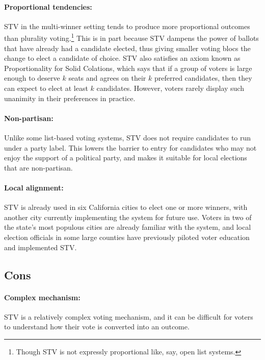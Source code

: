 \documentclass{amsart}
\theoremstyle{definition}
\begin{document}
\paragraph{\bf{Proportional tendencies:}} 
STV in the multi-winner setting tends to produce more
proportional outcomes than plurality voting.\footnote{Though STV is not expressly proportional like, say, open list systems.} 
This is in part because STV dampens the 
power of ballots that have already had a candidate elected, thus giving smaller
voting blocs the change to elect a candidate of choice.  
STV also satisfies an axiom known as Proportionality for Solid Colations,
which says that if a group of voters is large enough to deserve $k$ seats and agrees on 
their $k$ preferred candidates, then they can expect to elect at least $k$ candidates.
However, voters rarely display such unanimity in their preferences in practice.\\

\paragraph{\bf{Non-partisan:}} 
 Unlike some list-based voting systems, STV does not require 
    candidates to run under a party label. This lowers the barrier to entry
    for candidates who may not enjoy the support of a political party, and makes it 
    suitable for local elections that are non-partisan.\\

\paragraph{\bf{Local alignment:}} STV is already used in six California cities to elect one or more winners, 
with another city currently implementing the system for future use. 
Voters in two of the state's most populous cities are already familiar with the system, 
and local election officials in some large counties have previously piloted voter education 
and implemented STV.\\


\subsection{Cons}



   \paragraph{\bf{Complex mechanism:}} STV is a relatively complex voting mechanism, and it can be difficult 
                    for voters to understand how their vote is converted into an outcome.  \\
\end{document}
